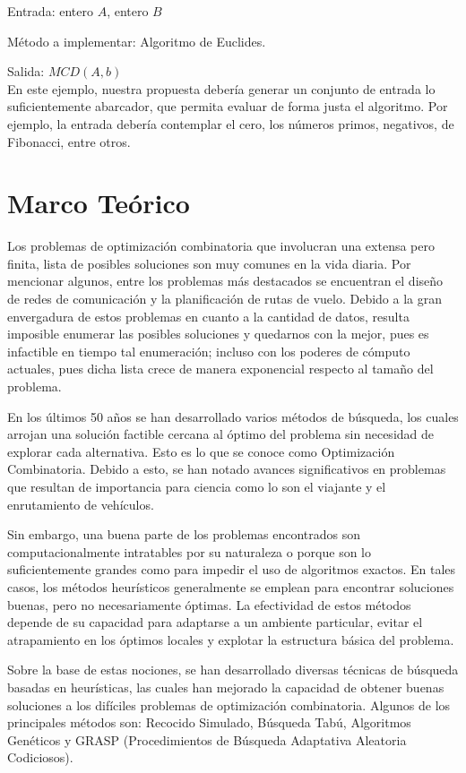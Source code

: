 \documentclass[a4paper,12pt]{book}
\begin{document}
	Entrada: entero $A$, entero $B$ 
	
	Método a implementar: Algoritmo de Euclides.
	
	Salida: $MCD(A, b)$ \\
	
	En este ejemplo, nuestra propuesta debería generar un conjunto de entrada lo suficientemente abarcador, que permita evaluar de forma justa el algoritmo. Por ejemplo, la entrada debería contemplar el cero, los números primos, negativos, de Fibonacci, entre otros.

\chapter{Marco Teórico}
	Los problemas de optimización combinatoria que involucran una extensa pero finita, lista de posibles soluciones son muy comunes en la vida diaria. Por mencionar algunos, entre los problemas más destacados se encuentran el diseño de redes de comunicación y la planificación de rutas de vuelo. Debido a la gran envergadura de estos problemas en cuanto a la cantidad de datos, resulta imposible enumerar las posibles soluciones y quedarnos con la mejor, pues es infactible en tiempo tal enumeración; incluso con los poderes de cómputo actuales, pues dicha lista crece de manera exponencial respecto al tamaño del problema.
	
	En los últimos 50 años se han desarrollado varios métodos de búsqueda, los cuales arrojan una solución factible cercana al óptimo del problema sin necesidad de explorar cada alternativa. Esto es lo que se conoce como Optimización Combinatoria. Debido a esto, se han notado avances significativos en problemas que resultan de importancia para ciencia como lo son el viajante y el enrutamiento de vehículos.
	
	Sin embargo, una buena parte de los problemas encontrados son computacionalmente intratables por su naturaleza o porque son lo suficientemente grandes como para impedir el uso de algoritmos exactos. En tales casos, los métodos heurísticos generalmente se emplean para encontrar soluciones buenas, pero no necesariamente óptimas. La efectividad de estos métodos depende de su capacidad para adaptarse a un ambiente particular, evitar el atrapamiento en los óptimos locales y explotar la estructura básica del problema.
	
	Sobre la base de estas nociones, se han desarrollado diversas técnicas de búsqueda basadas en heurísticas, las cuales han mejorado la capacidad de obtener buenas soluciones a los difíciles problemas de optimización combinatoria. Algunos de los principales métodos son: Recocido Simulado, Búsqueda Tabú, Algoritmos Genéticos y GRASP (Procedimientos de Búsqueda Adaptativa Aleatoria Codiciosos).
	
\end{document}
